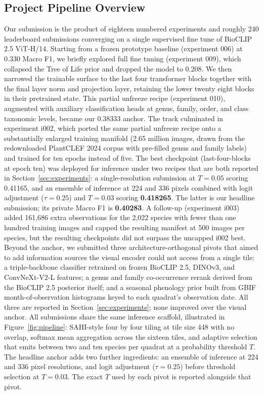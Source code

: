 \documentclass[sigconf]{ceurart}
\begin{document}
\subsection{Project Pipeline Overview}
\label{sec:pipeline}
Our submission is the product of eighteen numbered experiments and roughly 240 leaderboard submissions converging on a single supervised fine tune of BioCLIP 2.5 ViT-H/14. Starting from a frozen prototype baseline (experiment 006) at 0.330 Macro F1, we briefly explored full fine tuning (experiment 009), which collapsed the Tree of Life prior and dropped the model to 0.208. We then narrowed the trainable surface to the last four transformer blocks together with the final layer norm and projection layer, retaining the lower twenty eight blocks in their pretrained state. This partial unfreeze recipe (experiment 010), augmented with auxiliary classification heads at genus, family, order, and class taxonomic levels, became our 0.38333 anchor. The track culminated in experiment i002, which ported the same partial unfreeze recipe onto a substantially enlarged training manifold (2.65 million images, drawn from the redownloaded PlantCLEF 2024 corpus with pre-filled genus and family labels) and trained for ten epochs instead of five. The best checkpoint (last-four-blocks at epoch ten) was deployed for inference under two recipes that are both reported in Section~\ref{sec:experiments}: a single-resolution submission at $T{=}0.05$ scoring 0.41165, and an ensemble of inference at 224 and 336 pixels combined with logit adjustment ($\tau{=}0.25$) and $T{=}0.03$ scoring \textbf{0.418265}. The latter is our headline submission; its private Macro F1 is \textbf{0.40283}. A follow-up (experiment i003) added 161,686 extra observations for the 2,022 species with fewer than one hundred training images and capped the resulting manifest at 500 images per species, but the resulting checkpoints did not surpass the uncapped i002 best.
Beyond the anchor, we submitted three architecture-orthogonal pivots that aimed to add information sources the visual encoder could not access from a single tile: a triple-backbone classifier retrained on frozen BioCLIP 2.5, DINOv3, and ConvNeXt-V2-L features; a genus and family co-occurrence rerank derived from the BioCLIP 2.5 posterior itself; and a seasonal phenology prior built from GBIF month-of-observation histograms keyed to each quadrat's observation date. All three are reported in Section~\ref{sec:experiments}; none improved over the visual anchor.
All submissions share the same inference scaffold, illustrated in Figure~\ref{fig:pipeline}: SAHI-style four by four tiling at tile size 448 with no overlap, softmax mean aggregation across the sixteen tiles, and adaptive selection that emits between two and ten species per quadrat at a probability threshold $T$. The headline anchor adds two further ingredients: an ensemble of inference at 224 and 336 pixel resolutions, and logit adjustment ($\tau{=}0.25$) before threshold selection at $T{=}0.03$. The exact $T$ used by each pivot is reported alongside that pivot.
\end{document}
